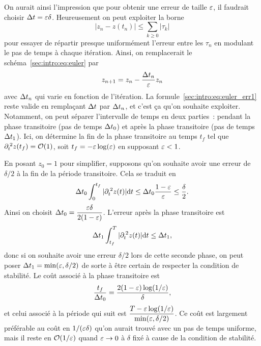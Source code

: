On aurait ainsi l'impression que pour obtenir une erreur de taille
$\varepsilon$, il faudrait choisir $\Delta t = \varepsilon \delta$. Heureusement on peut
exploiter la borne
\begin{equation*}
    \left| z_n - z(t_n) \right| \leq \sum_{k \geq 0} |\tau_k| 
\end{equation*}
pour essayer de répartir presque uniformément l'erreur entre les
$\tau_n$ en modulant le pas de temps à chaque itération. Ainsi, on
remplacerait le schéma~\eqref{sec:intro:eq:euler} par 
\begin{equation*}
    z_{n+1} = z_n - \frac{\Delta t_n}{\varepsilon} z_n
\end{equation*}
avec $\Delta t_n$ qui varie en fonction de l'itération. La
formule~\eqref{sec:intro:eq:euler_err1} reste valide en remplaçant $\Delta t$
par $\Delta t_n$, et c'est ça qu'on souhaite exploiter. Notamment, on peut
séparer l'intervalle de temps en deux parties~: pendant la phase
transitoire (pas de temps $\Delta t_0$) et après la phase transitoire (pas de
temps $\Delta t_1$). Ici, on détermine la fin de la phase transitoire au
temps $t_f$ tel que $\partial_t^{\:2} z(t_f) = \mathcal{O}(1)$, soit $t_f = -\varepsilon
\log(\varepsilon)$ en supposant $\varepsilon < 1$. 

En posant $z_0 = 1$ pour simplifier, supposons qu'on souhaite avoir une
erreur de $\delta/2$ à la fin de la période transitoire. Cela se traduit
en 
\begin{equation*}
    \Delta t_0 \int_0^{t_f} |\partial_t^{\:2} z(t)| \mathrm{d} t 
    \leq \Delta t_0 \frac{1 - \varepsilon}{\varepsilon} \leq \frac{\delta}{2} .
\end{equation*}
Ainsi on choisit $\displaystyle \Delta t_0 = \frac{\varepsilon \delta}{2(1 -
\varepsilon)}$. L'erreur après la phase transitoire est 
\begin{equation*}
    \Delta t_1 \int_{t_f}^{T} |\partial_t^{\:2} z(t)| \mathrm{d} t 
    \leq \Delta t_1 ,
\end{equation*}
donc si on souhaite avoir une erreur $\delta/2$ lors de cette seconde
phase, on peut poser $\Delta t_1 = \min(\varepsilon, \delta/2)$ de sorte à être
certain de respecter la condition de stabilité. Le coût associé à la
phase transitoire est 
\begin{equation*}
    \frac{t_f}{\Delta t_0} = \frac{2 (1-\varepsilon) \log(1/\varepsilon)}{\delta} ,
\end{equation*}
et celui associé à la période qui suit est $\displaystyle \frac{ T -
\varepsilon \log(1/\varepsilon)}{\min(\varepsilon, \delta/2)}$. Ce coût est largement
préférable au coût en $1/(\varepsilon \delta)$ qu'on aurait trouvé avec un pas
de temps uniforme, mais il reste en $\mathcal{O}(1/\varepsilon)$ quand $\varepsilon
\rightarrow 0$ à $\delta$ fixé à cause de la condition de stabilité.




